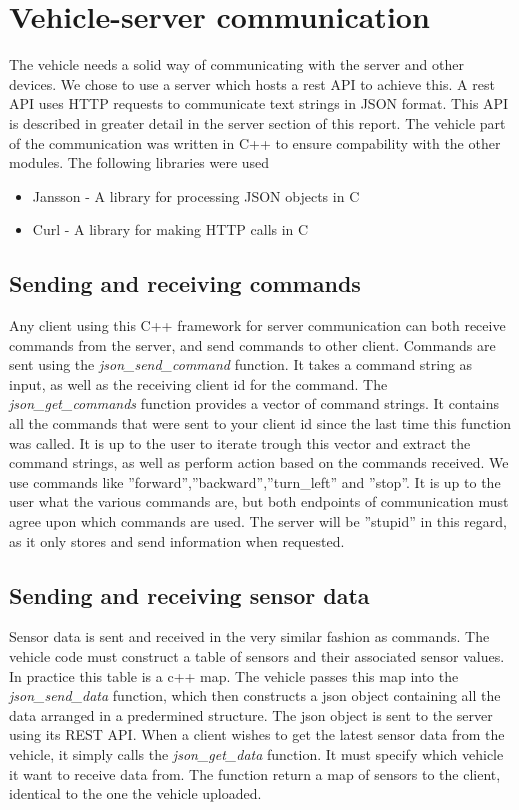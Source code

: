 \section{Vehicle-server communication}
The vehicle needs a solid way of communicating with the server and other devices. We chose to use a server which hosts a rest API to achieve this. A rest API uses HTTP requests to communicate text strings in JSON format. This API is described in greater detail in the server section of this report. The vehicle part of the communication was written in C++ to ensure compability with the other modules. The following libraries were used
\begin{itemize}
    \item Jansson - A library for processing JSON objects in C
    \item Curl - A library for making HTTP calls in C
\end{itemize}

\subsection{Sending and receiving commands}
Any client using this C++ framework for server communication can both receive commands from the server, and send commands to other client.
Commands are sent using the \textit{json\_send\_command} function. It takes a command string as input, as well as the receiving client id for the command.
The \textit{json\_get\_commands} function provides a vector of command strings. It contains all the commands that were sent to your client id since the last time this function was called. 
It is up to the user to iterate trough this vector and extract the command strings, as well as perform action based on the commands received. 
We use commands like ''forward'',''backward'',''turn\_left'' and ''stop''. It is up to the user what the various commands are, but both endpoints of communication must agree upon which commands are used. The server will be ''stupid'' in this regard, as it only stores and send information when requested.

\subsection{Sending and receiving sensor data}
Sensor data is sent and received in the very similar fashion as commands.
The vehicle code must construct a table of sensors and their associated sensor values. 
In practice this table is a c++ map. 
The vehicle passes this map into the \textit{json\_send\_data} function, which then constructs a json object containing all the data arranged in a predermined structure. 
The json object is sent to the server using its REST API.
When a client wishes to get the latest sensor data from the vehicle, it simply calls the \textit{json\_get\_data} function. It must specify which vehicle it want to receive data from. The function return a map of sensors to the client, identical to the one the vehicle uploaded.


